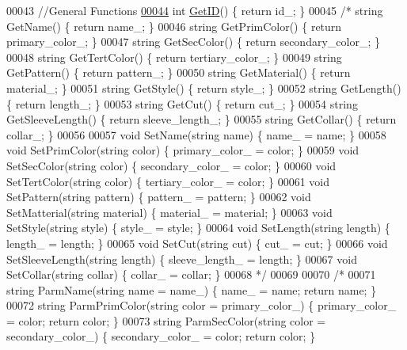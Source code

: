 \begin{DoxyCode}
00043     \textcolor{comment}{//General Functions}
\mbox{\hyperlink{classClothes_a3f6dac172f333126d19010f85ec44e4c}{00044}}     \textcolor{keywordtype}{int} \mbox{\hyperlink{classClothes_a3f6dac172f333126d19010f85ec44e4c}{GetID}}() \{ \textcolor{keywordflow}{return} id\_; \}
00045   \textcolor{comment}{/*  string GetName() \{ return name\_; \}}
00046 \textcolor{comment}{    string GetPrimColor() \{ return primary\_color\_; \}}
00047 \textcolor{comment}{    string GetSecColor() \{ return secondary\_color\_; \}}
00048 \textcolor{comment}{    string GetTertColor() \{ return tertiary\_color\_; \}}
00049 \textcolor{comment}{    string GetPattern() \{ return pattern\_; \}}
00050 \textcolor{comment}{    string GetMaterial() \{ return material\_; \}}
00051 \textcolor{comment}{    string GetStyle() \{ return style\_; \}}
00052 \textcolor{comment}{    string GetLength() \{ return length\_; \}}
00053 \textcolor{comment}{    string GetCut() \{ return cut\_; \}}
00054 \textcolor{comment}{    string GetSleeveLength() \{ return sleeve\_length\_; \}}
00055 \textcolor{comment}{    string GetCollar() \{ return collar\_; \}}
00056 \textcolor{comment}{}
00057 \textcolor{comment}{    void SetName(string name) \{ name\_ = name; \}}
00058 \textcolor{comment}{    void SetPrimColor(string color) \{ primary\_color\_ = color; \}}
00059 \textcolor{comment}{    void SetSecColor(string color) \{ secondary\_color\_ = color; \}}
00060 \textcolor{comment}{    void SetTertColor(string color) \{ tertiary\_color\_ = color; \}}
00061 \textcolor{comment}{    void SetPattern(string pattern) \{ pattern\_ = pattern; \}}
00062 \textcolor{comment}{    void SetMatterial(string material) \{ material\_ = material; \}}
00063 \textcolor{comment}{    void SetStyle(string style) \{ style\_ = style; \}}
00064 \textcolor{comment}{    void SetLength(string length) \{ length\_ = length; \}}
00065 \textcolor{comment}{    void SetCut(string cut) \{ cut\_ = cut; \}}
00066 \textcolor{comment}{    void SetSleeveLength(string length) \{ sleeve\_length\_ = length; \}}
00067 \textcolor{comment}{    void SetCollar(string collar) \{ collar\_ = collar; \}}
00068 \textcolor{comment}{    */}
00069 
00070     \textcolor{comment}{/*}
00071 \textcolor{comment}{    string ParmName(string name = name\_) \{ name\_ = name; return name; \}}
00072 \textcolor{comment}{    string ParmPrimColor(string color = primary\_color\_) \{ primary\_color\_ = color; return color; \}}
00073 \textcolor{comment}{    string ParmSecColor(string color = secondary\_color\_) \{ secondary\_color\_ = color; return color; \}}

\end{DoxyCode}
